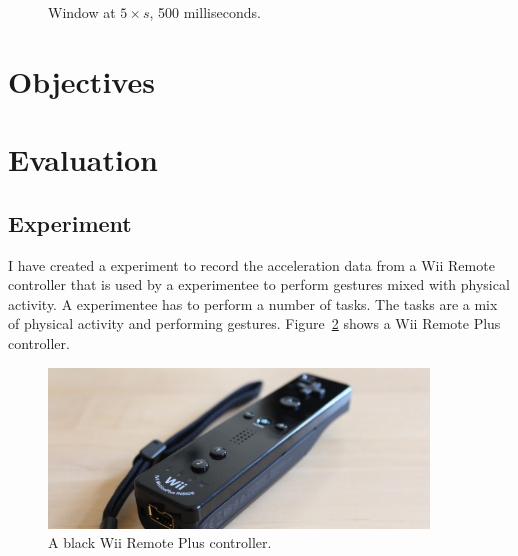 \documentclass[runningheads,a4paper]{llncs}
\begin{document}
    \begin{figure}
        \centering
        \caption{Window at $5 \times s$, 500 milliseconds.}
        \label{fig:window3}
    \end{figure}

    \section{Objectives}

    \section{Evaluation}

    \subsection{Experiment}
    I have created a experiment to record the acceleration data from a Wii Remote controller that is used by a
    experimentee to perform gestures mixed with physical activity. A experimentee has to perform a number of tasks. The
    tasks are a mix of physical activity and performing gestures. Figure~\ref{fig:wii-remote} shows a Wii Remote Plus
    controller.

    \begin{figure}
        \centering
        \includegraphics[width=0.9\textwidth]{wii-remote-plus.jpg}
        \caption{A black Wii Remote Plus controller.}
        \label{fig:wii-remote}
    \end{figure}
\end{document}
